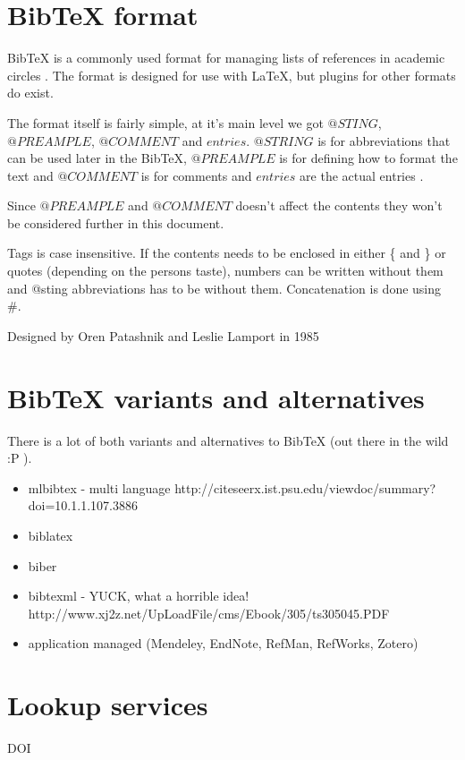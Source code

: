 \section{Bib{\TeX} format}
Bib{\TeX} is a commonly used format for managing lists of references in
academic circles .  The format is
designed for use with {\LaTeX}, but plugins for other formats do
exist. \autocite{bibtex_resource}

The format itself is fairly simple, at it's main level we got
$@STING$, $@PREAMPLE$, $@COMMENT$ and $entries$.  $@STRING$ is for
abbreviations that can be used later in the Bib{\TeX}, $@PREAMPLE$ is for
defining how to format the text and $@COMMENT$ is for comments and
$entries$ are the actual entries \autocite{bibtex_resource}.

Since $@PREAMPLE$ and $@COMMENT$ doesn't affect the contents they
won't be considered further in this document. 

Tags is case insensitive. If the contents needs to be enclosed in
either \{ and \} or quotes (depending on the persons taste), numbers
can be written without them and @sting abbreviations has to be without
them. Concatenation is done using \#.\autocite{bibtex_resource}

Designed by Oren Patashnik and Leslie Lamport in 1985




\section{BibTeX variants and alternatives}
There is a lot of both variants and alternatives to BibTeX (out there in the wild :P ).

\begin{itemize}
\item mlbibtex - multi language http://citeseerx.ist.psu.edu/viewdoc/summary?doi=10.1.1.107.3886
\item biblatex
\item biber
\item bibtexml - YUCK, what a horrible idea! http://www.xj2z.net/UpLoadFile/cms/Ebook/305/ts305045.PDF
\item application managed (Mendeley, EndNote, RefMan, RefWorks, Zotero)
\end{itemize}

\section{Lookup services}
DOI

